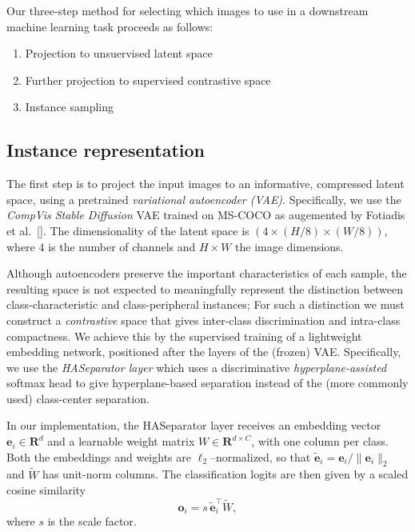 \documentclass{article}
\begin{document}
Our three-step method for selecting which images to use in a
downstream machine learning task proceeds as follows:
%
\begin{enumerate}
\item Projection to unsuervised latent space
\item Further projection to supervised contrastive space
\item Instance sampling
\end{enumerate}


\subsection{Instance representation}


The first step is to project the input images to an informative,
compressed latent space, using a pretrained
\emph{variational autoencoder (VAE)}.
Specifically, we use the \emph{CompVis Stable Diffusion} VAE
trained on MS-COCO \cite{rombach-blattmann-etal:2021}
as augemented by Fotiadis et al.~[\citeyear{fotiadis-valencia-etal:2022}].
The dimensionality of the latent space is
$(4 \times (H/8) \times (W/8))$, where $4$ is the number of channels
and $H \times W$ the image dimensions.

Although autoencoders preserve the important characteristics of each
sample, the resulting space is not expected to meaningfully represent
the distinction between class-characteristic and class-peripheral
instances; For such a distinction we must construct a \emph{contrastive}
space that gives inter-class discrimination and intra-class
compactness. We achieve this by the supervised training of a
lightweight embedding network, positioned after the layers
of the (frozen) VAE. Specifically, we use
the \emph{HASeparator layer} \cite{kansizoglou-santavas-etal:2020}
which uses a discriminative \emph{hyperplane-assisted} softmax head to
give hyperplane-based separation instead of the (more commonly used)
class-center separation.

In our implementation, the HASeparator layer receives an embedding
vector $\mathbf{e}_i \in \mathbf{R}^d$ and a learnable weight matrix
$W \in \mathbf{R}^{d \times C}$, with one column per class. Both the
embeddings and weights are $\ell_2$–normalized, so that
$\tilde{\mathbf{e}}_i = \mathbf{e}_i / \|\mathbf{e}_i\|_2$ and
$\tilde{W}$ has unit-norm columns. The classification logits are then
given by a scaled cosine similarity
\[
\mathbf{o}_i = s \, \tilde{\mathbf{e}}_i^\top \tilde{W},
\]
where $s$ is the scale factor. 
\end{document}
